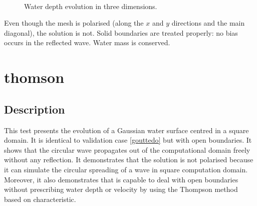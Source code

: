 \begin{figure}[!htbp]
\begin{minipage}[t]{0.50\textwidth}
 \centering
\end{minipage}%
\begin{minipage}[t]{0.50\textwidth}
 \centering
\end{minipage}\\
\begin{minipage}[t]{0.50\textwidth}
 \centering
\end{minipage}
\begin{minipage}[t]{0.50\textwidth}
 \centering
\end{minipage}
\begin{minipage}[t]{0.50\textwidth}
 \centering
\end{minipage}%
\begin{minipage}[t]{0.50\textwidth}
 \centering
\end{minipage}
 \caption{Water depth evolution in three dimensions.}
 \label{t3d:gouttedo:fig:depth_evol3D}
\end{figure}
%
\bigskip
Even though the mesh is polarised (along the $x$ and $y$ directions and
the main diagonal), the solution is not.
Solid boundaries are treated properly: no bias occurs in the reflected
wave. Water mass is conserved.


\chapter{thomson}
%
\section{Description}
\bigskip
This test presents the evolution of a Gaussian water surface centred
in a square domain.
It is identical to validation case \ref{gouttedo} but with open boundaries.
It shows that the circular wave propagates out of the computational
domain freely without any reflection.
It demonstrates that the  solution is not polarised because
it can simulate the circular spreading of a wave in square computation
domain.
Moreover, it also demonstrates that  is capable to deal
with open boundaries without prescribing water depth or velocity by
using the Thompson method based on characteristic.

